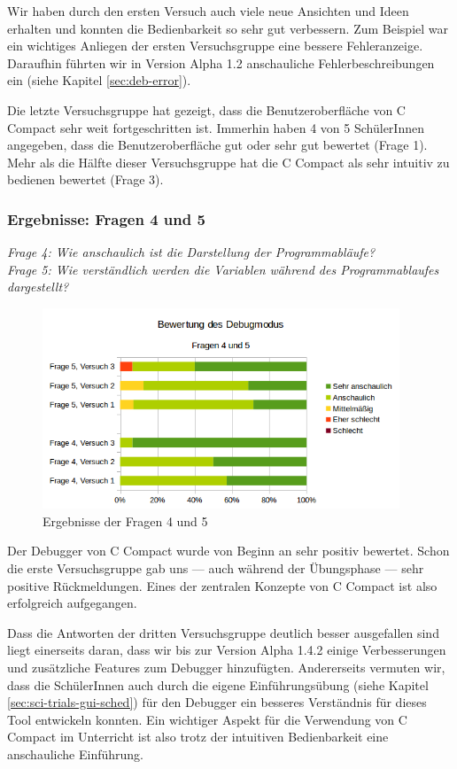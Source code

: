 Wir haben durch den ersten Versuch auch viele neue Ansichten und Ideen erhalten und konnten die Bedienbarkeit so sehr gut verbessern. Zum Beispiel war ein wichtiges Anliegen der ersten Versuchsgruppe eine bessere Fehleranzeige. Daraufhin führten wir in Version Alpha 1.2 anschauliche Fehlerbeschreibungen ein (siehe Kapitel \ref{sec:deb-error}).

Die letzte Versuchsgruppe hat gezeigt, dass die Benutzeroberfläche von C Compact sehr weit fortgeschritten ist. Immerhin haben 4 von 5 SchülerInnen angegeben, dass die Benutzeroberfläche \glqq{}gut\grqq{} oder \glqq{}sehr gut\grqq{} bewertet (Frage 1). Mehr als die Hälfte dieser Versuchsgruppe hat die C Compact als \glqq{}sehr intuitiv zu bedienen\grqq{} bewertet (Frage 3).

\subsubsection*{Ergebnisse: Fragen 4 und 5}

\emph{Frage 4: Wie anschaulich ist die Darstellung der Programmabläufe?\\
Frage 5: Wie verständlich werden die Variablen während des Programmablaufes dargestellt?}

\begin{figure}[h!]
\centering
\includegraphics[width=0.95\textwidth]{./media/images/gui/trials/gui-f4-5.png}
\caption{Ergebnisse der Fragen 4 und 5}
\end{figure}

Der Debugger von C Compact wurde von Beginn an sehr positiv bewertet. Schon die erste Versuchsgruppe gab uns --- auch während der Übungsphase --- sehr positive Rückmeldungen. Eines der zentralen Konzepte von C Compact ist also erfolgreich aufgegangen.

Dass die Antworten der dritten Versuchsgruppe deutlich besser ausgefallen sind liegt einerseits daran, dass wir bis zur Version Alpha 1.4.2 einige Verbesserungen und zusätzliche Features zum Debugger hinzufügten. Andererseits vermuten wir, dass die SchülerInnen auch durch die eigene Einführungsübung (siehe Kapitel \ref{sec:sci-trials-gui-sched}) für den Debugger ein besseres Verständnis für dieses Tool entwickeln konnten. Ein wichtiger Aspekt für die Verwendung von C Compact im Unterricht ist also trotz der intuitiven Bedienbarkeit eine anschauliche Einführung.


